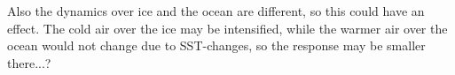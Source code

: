 Also the dynamics over ice and the ocean are different, so this could have an effect. The cold air over the ice may be intensified, while the warmer air over the ocean would not change due to SST-changes, so the response may be smaller there...?







